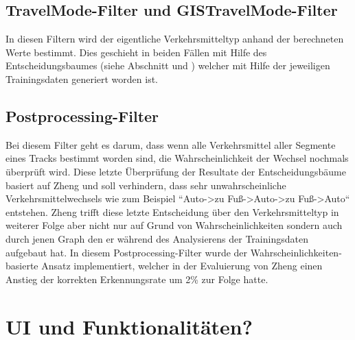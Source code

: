 \subsection{TravelMode-Filter und GISTravelMode-Filter}
In diesen Filtern wird der eigentliche Verkehrsmitteltyp anhand der berechneten Werte bestimmt. Dies geschieht in beiden Fällen mit Hilfe des Entscheidungsbaumes (siehe Abschnitt  und ) welcher mit Hilfe der jeweiligen Trainingsdaten generiert worden ist. 

\subsection{Postprocessing-Filter}
Bei diesem Filter geht es darum, dass wenn alle Verkehrsmittel aller Segmente eines Tracks bestimmt worden sind, die Wahrscheinlichkeit der Wechsel nochmals überprüft wird. Diese letzte Überprüfung der Resultate der Entscheidungsbäume basiert auf Zheng \cite{zheng_understanding_2010} und soll verhindern, dass sehr unwahrscheinliche Verkehrsmittelwechsels wie zum Beispiel ``Auto->zu Fuß->Auto->zu Fuß->Auto`` entstehen. Zheng trifft diese letzte Entscheidung über den Verkehrsmitteltyp in weiterer Folge aber nicht nur auf Grund von Wahrscheinlichkeiten sondern auch durch jenen Graph den er während des Analysierens der Trainingsdaten aufgebaut hat. In diesem Postprocessing-Filter wurde der Wahrscheinlichkeiten-basierte Ansatz implementiert, welcher in der Evaluierung von Zheng einen Anstieg der korrekten Erkennungsrate um 2\% zur Folge hatte.

\section{UI und Funktionalitäten?}
